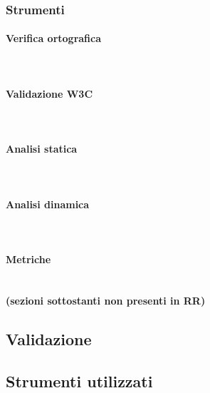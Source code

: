 		\subsubsection{Strumenti}
			\paragraph{Verifica ortografica} \mbox{}\\
			\paragraph{Validazione W3C} \mbox{}\\
			\paragraph{Analisi statica} \mbox{}\\
			\paragraph{Analisi dinamica} \mbox{}\\
			\paragraph{Metriche} \mbox{}\\
	
	\textbf{(sezioni sottostanti non presenti in RR)}
	\subsection{Validazione}
	\subsection{Strumenti utilizzati}
	
